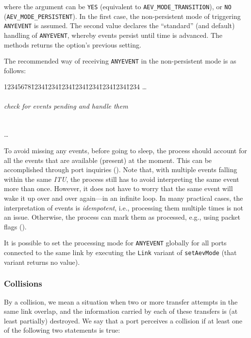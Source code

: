 \noindent
where the argument can be {\tt YES} (equivalent to
{\tt AEV\_MODE\_TRANSITION}), or
{\tt NO} ({\tt AEV\_MODE\_PERSISTENT}).
In the first case, the non-persistent mode of triggering {\tt ANYEVENT} is
assumed.
The second value declares the ``standard'' (and default) handling of
{\tt ANYEVENT}, whereby events persist until time is advanced.
The methods returns the option's previous setting.

The recommended way of receiving {\tt ANYEVENT} in the non-persistent mode
is as follows:

{\tt\begin{tabbing}
12345678\=1234\=1234\=1234\=1234\=1234\=1234\=1234\=1234\kill
\>\ldots \\
 \\
\>\> {\em check for events pending and handle them} \\
\> \\
\>  \\
\> \ldots \\
\end{tabbing}}

\noindent
To avoid missing any events, before going to sleep, the process should account
for all the events that are available (present) at the moment.
This can be accomplished through port inquiries ().
Note that, with multiple events falling within the same {\em ITU}, the process
still has to avoid interpreting the same event more than once.
However, it does not have to worry that the same event will wake it up over and
over again---in an infinite loop.
In many practical cases, the interpretation of events is {\em idempotent},
i.e., processing them multiple times is not an issue.
Otherwise, the process can mark them as processed, e.g., using packet
flags ().

It is possible to set the processing mode for {\tt ANYEVENT} globally for all
ports connected to the same link by executing the {\tt Link} variant of
{\tt setAevMode} (that variant returns no value).

\subsubsection{Collisions}
\label{rm_po_wr_co}

By a collision, we mean a situation when two or more transfer attempts in
the same link overlap, and the information carried by each of these transfers
is (at least partially) destroyed.
We say that a port perceives a collision if at least one of the following two
statements is true:

